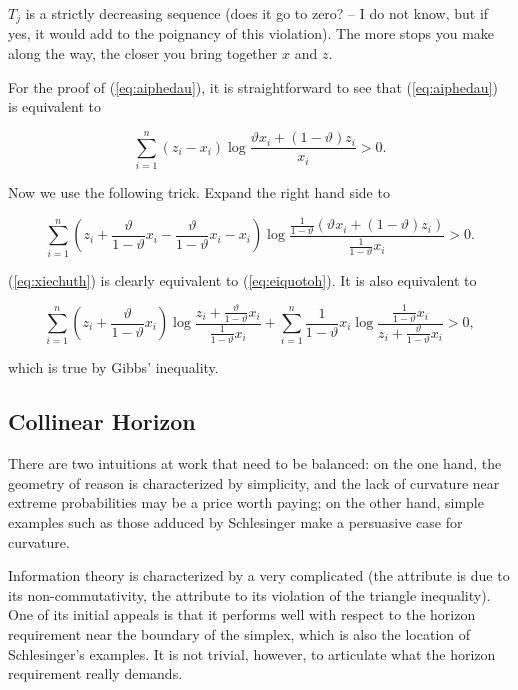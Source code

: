 \documentclass[phd,12pt,oneside]{ubcthesis}
\begin{document}
$T_{j}$ is a strictly decreasing sequence (does it go to zero? -- I do
not know, but if yes, it would add to the poignancy of this
violation). The more stops you make along the way, the closer you
bring together $x$ and $z$.

For the proof of (\ref{eq:aiphedau}), it is straightforward to see
that (\ref{eq:aiphedau}) is equivalent to

\begin{equation}
  \label{eq:eiquotoh}
  \sum_{i=1}^{n}(z_{i}-x_{i})\log\frac{\vartheta{}x_{i}+(1-\vartheta)z_{i}}{x_{i}}>0.
\end{equation}

{\noindent}Now we use the following trick. Expand the right hand side to

\begin{equation}
  \label{eq:xiechuth}
  \sum_{i=1}^{n}\left(z_{i}+\frac{\vartheta}{1-\vartheta}x_{i}-\frac{\vartheta}{1-\vartheta}x_{i}-x_{i}\right)\log\frac{\frac{1}{1-\vartheta}\left(\vartheta{}x_{i}+(1-\vartheta)z_{i}\right)}{\frac{1}{1-\vartheta}x_{i}}>0.
\end{equation}

{\noindent}(\ref{eq:xiechuth}) is clearly equivalent to (\ref{eq:eiquotoh}). It
is also equivalent to

\begin{equation}
  \label{eq:ohrohshi}
  \sum_{i=1}^{n}\left(z_{i}+\frac{\vartheta}{1-\vartheta}x_{i}\right)\log\frac{z_{i}+\frac{\vartheta}{1-\vartheta}x_{i}}{\frac{1}{1-\vartheta}x_{i}}+
  \sum_{i=1}^{n}\frac{1}{1-\vartheta}x_{i}\log\frac{\frac{1}{1-\vartheta}x_{i}}{z_{i}+\frac{\vartheta}{1-\vartheta}x_{i}}>0,
\end{equation}

{\noindent}which is true by Gibbs' inequality.


\subsection{Collinear Horizon}
\label{subsec:colhor}

There are two intuitions at work that need to be balanced: on the one
hand, the geometry of reason is characterized by simplicity, and the
lack of curvature near extreme probabilities may be a price worth
paying; on the other hand, simple examples such as those adduced by
Schlesinger make a persuasive case for curvature.

Information theory is characterized by a very complicated
 (the attribute  is due to its
non-commutativity, the attribute  to its violation of the
triangle inequality). One of its initial appeals is that it performs
well with respect to the horizon requirement near the boundary of the
simplex, which is also the location of Schlesinger's examples. It is
not trivial, however, to articulate what the horizon requirement
really demands.
\end{document}
